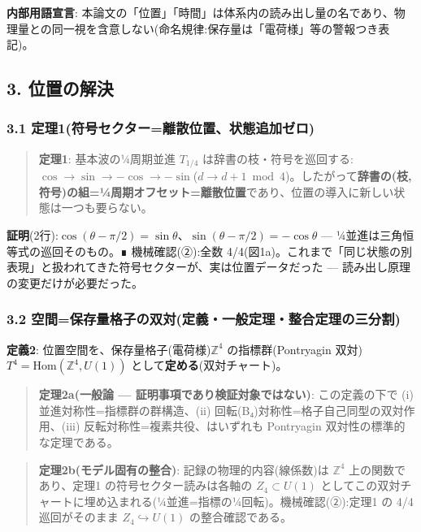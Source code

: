 \documentclass[
]{ltjsarticle}
\begin{document}
\textbf{内部用語宣言}:
本論文の「位置」「時間」は体系内の読み出し量の名であり、物理量との同一視を含意しない(命名規律:保存量は「電荷様」等の警報つき表記)。

\subsection{3. 位置の解決}\label{ux4f4dux7f6eux306eux89e3ux6c7a}

\subsubsection{3.1
定理1(符号セクター=離散位置、状態追加ゼロ)}\label{ux5b9aux74061ux7b26ux53f7ux30bbux30afux30bfux30fcux96e2ux6563ux4f4dux7f6eux72b6ux614bux8ffdux52a0ux30bcux30ed}

\begin{quote}
\textbf{定理1}: 基本波の¼周期並進 \(T_{1/4}\)
は辞書の枝・符号を巡回する:\(\cos\to\sin\to-\cos\to-\sin\)(\(d\to d+1\bmod 4\))。したがって\textbf{辞書の(枝,
符号)の組=¼周期オフセット=離散位置}であり、位置の導入に新しい状態は一つも要らない。
\end{quote}

\textbf{証明}(2行):\(\cos(\theta-\pi/2)=\sin\theta\)、\(\sin(\theta-\pi/2)=-\cos\theta\)
--- ¼並進は三角恒等式の巡回そのもの。∎ 機械確認(②):全数
4/4(図1a)。これまで「同じ状態の別表現」と扱われてきた符号セクターが、実は位置データだった
--- 読み出し原理の変更だけが必要だった。

\subsubsection{3.2
空間=保存量格子の双対(定義・一般定理・整合定理の三分割)}\label{ux7a7aux9593ux4fddux5b58ux91cfux683cux5b50ux306eux53ccux5bfeux5b9aux7fa9ux4e00ux822cux5b9aux7406ux6574ux5408ux5b9aux7406ux306eux4e09ux5206ux5272}

\textbf{定義2}: 位置空間を、保存量格子(電荷様)\(\mathbb{Z}^4\)
の指標群(Pontryagin 双対)\(T^4=\mathrm{Hom}(\mathbb{Z}^4,U(1))\)
として\textbf{定める}(双対チャート)。

\begin{quote}
\textbf{定理2a(一般論 --- 証明事項であり検証対象ではない)}:
この定義の下で (i) 並進対称性=指標群の群構造、(ii)
回転(B₄)対称性=格子自己同型の双対作用、(iii)
反転対称性=複素共役、はいずれも Pontryagin 双対性の標準的な定理である。
\end{quote}

\begin{quote}
\textbf{定理2b(モデル固有の整合)}: 記録の物理的内容(線係数)は
\(\mathbb{Z}^4\) 上の関数であり、定理1 の符号セクター読みは各軸の
\(Z_4\subset U(1)\)
としてこの双対チャートに埋め込まれる(¼並進=指標の¼回転)。機械確認(②):定理1
の 4/4 巡回がそのまま \(Z_4\hookrightarrow U(1)\) の整合確認である。
\end{quote}
\end{document}
